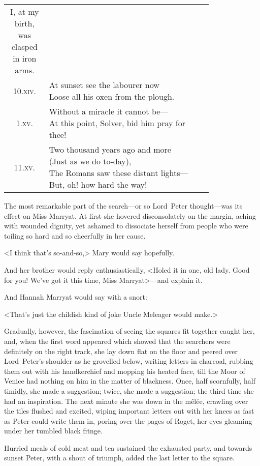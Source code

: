 \begin{longtable} {c p{0.8\linewidth}}
{I, at my birth, was clasped in iron arms.}\\
10.\textsc{xiv.} &  \makecell[l]{At sunset see the labourer now\\
Loose all his oxen from the plough.}\\
1.\textsc{xv.} &  \makecell[l]{Without a miracle it cannot be—\\
At this point, Solver, bid him pray for thee!}\\[.3cm] 
11.\textsc{xv.} &  \makecell[l]{Two thousand years ago and more\\
(Just as we do to-day),\\
The Romans saw these distant lights—\\
But, oh! how hard the way!}
\end{longtable}

\divider
The most remarkable part of the search—or so Lord~Peter thought—was its effect on Miss Marryat. At first she hovered disconsolately on the margin, aching with wounded dignity, yet ashamed to dissociate herself from people who were toiling so hard and so cheerfully in her cause.

<I think that's so-and-so,> Mary would say hopefully.

And her brother would reply enthusiastically, <Holed it in one, old lady. Good for you! We've got it this time, Miss Marryat>—and explain it.

And Hannah Marryat would say with a snort:

<That's just the childish kind of joke Uncle Meleager would make.>

Gradually, however, the fascination of seeing the squares fit together caught her, and, when the first word appeared which showed that the searchers were definitely on the right track, she lay down flat on the floor and peered over Lord~Peter's shoulder as he grovelled below, writing letters in charcoal, rubbing them out with his handkerchief and mopping his heated face, till the Moor of Venice had nothing on him in the matter of blackness. Once, half scornfully, half timidly, she made a suggestion; twice, she made a suggestion; the third time she had an inspiration. The next minute she was down in the mêlée, crawling over the tiles flushed and excited, wiping important letters out with her knees as fast as Peter could write them in, poring over the pages of Roget, her eyes gleaming under her tumbled black fringe.

Hurried meals of cold meat and tea sustained the exhausted party, and towards sunset Peter, with a shout of triumph, added the last letter to the square.

